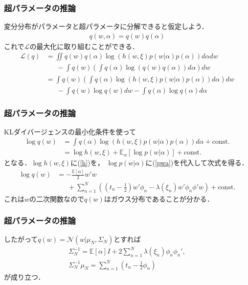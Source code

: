 \documentclass[10pt,hyperref={unicode}]{beamer}
\newcommand{\paref}[1]{{\fontfamily{cmr}\selectfont (\ref{#1})}}
\newcommand{\parentheses}[1]{\left(#1\right)}
\newcommand{\brackets}[1]{\left[#1\right]}
\newcommand{\const}{\mathrm{const.}}
\newcommand{\energy}{\mathcal{L}}
\begin{document}
\begin{frame}
\frametitle{超パラメータの推論}
変分分布がパラメータと超パラメータに分解できると仮定しよう．
\begin{align}
    q\parentheses{w, \alpha} = q\parentheses{w}q\parentheses{\alpha} \tag{10.173}
\end{align}
これで$\energy$の最大化に取り組むことができる．
\begin{align*}
    \energy\parentheses{q}
    &= \iint q\parentheses{w}q\parentheses{\alpha} \log \parentheses{h\parentheses{w,\xi}p\parentheses{w|\alpha}p\parentheses{\alpha}} d\alpha dw \\
    &\phantom{=}\ -\int q\parentheses{w}\parentheses{\int q\parentheses{\alpha} \log\parentheses{q\parentheses{w}q\parentheses{\alpha}} d\alpha} dw \\
    &= \int q\parentheses{w}\parentheses{\int q\parentheses{\alpha} \log \parentheses{h\parentheses{w,\xi}p\parentheses{w|\alpha}p\parentheses{\alpha}} d\alpha} dw \\
    &\phantom{=}\ -\int q\parentheses{w} \log q\parentheses{w} dw
            -\int q\parentheses{\alpha} \log q\parentheses{\alpha} d\alpha
\end{align*}
\end{frame}

\begin{frame}
\frametitle{超パラメータの推論}
KLダイバージェンスの最小化条件を使って
\begin{align*}
    \log q\parentheses{w}
    &= \int q\parentheses{\alpha} \log \parentheses{h\parentheses{w,\xi}p\parentheses{w|\alpha}p\parentheses{\alpha}} d\alpha + \const \\
    &= \log h\parentheses{w,\xi} + \mathbb{E}_\alpha \brackets{\log p\parentheses{w|\alpha}} + \const
\end{align*}
となる．$\log h\parentheses{w,\xi}$に\paref{h}を，
$\log p\parentheses{w|\alpha}$に\paref{pwa}を代入して次式を得る．
\setlength{\fboxsep}{2pt}
\begin{align*}
    \log q\parentheses{w}
    &= -\frac{\mathbb{E}\brackets{\alpha}}{2}w'w \\
    &\phantom{=}\ + \sum_{n = 1}^N \parentheses{\parentheses{t_n - \frac{1}{2}}w'\phi_n - \lambda\parentheses{\xi_n}w'\phi_n\phi'w} + \const
\end{align*}
これは$w$の二次関数なので$q\parentheses{w}$はガウス分布であることが分かる．
\end{frame}

\begin{frame}
\frametitle{超パラメータの推論}
したがって$q\parentheses{w} = \mathcal{N}\parentheses{w|\mu_N, \varSigma_N}$とすれば
\begin{gather}
    \varSigma_{N}^{-1} = \mathbb{E}\brackets{\alpha}I + 2 \sum_{n = 1}^N \lambda\parentheses{\xi_n}\phi_n\phi_n', \tag{10.176} \\
    \varSigma_{N}^{-1} \mu_N = \sum_{n = 1}^N \parentheses{t_n - \frac{1}{2}\phi_n} \tag{10.175}
\end{gather}
が成り立つ．
\end{frame}
\end{document}
